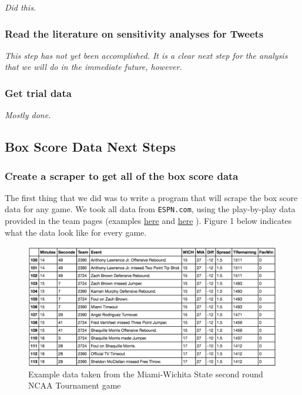 \documentclass[12pt]{article}
\begin{document}
\textit{Did this.}

\subsubsection*{Read the literature on sensitivity analyses for Tweets}

\textit{This step has not yet been accomplished. It is a clear next step for the analysis that we will do in the immediate future, however.}

\subsubsection*{Get trial data}

\textit{Mostly done.}

\subsection*{Box Score Data Next Steps}
\subsubsection*{Create a scraper to get all of the box score data}

The first thing that we did was to write a program that will scrape the box score data for any game. We took all data from \texttt{ESPN.com}, using the play-by-play data provided in the team pages (examples \href{http://espn.go.com/mens-college-basketball/playbyplay?gameId=400871280}{here}
 and \href{http://espn.go.com/mens-college-basketball/playbyplay?gameId=400871252}{here}
). Figure 1 below indicates what the data look like for every game.

\begin{figure} [H]
	\centering
	\includegraphics[scale = 0.7] {boxscore_data.png} 
	\caption{Example data taken from the Miami-Wichita State second round NCAA Tournament game}
\end{figure}
\end{document}
